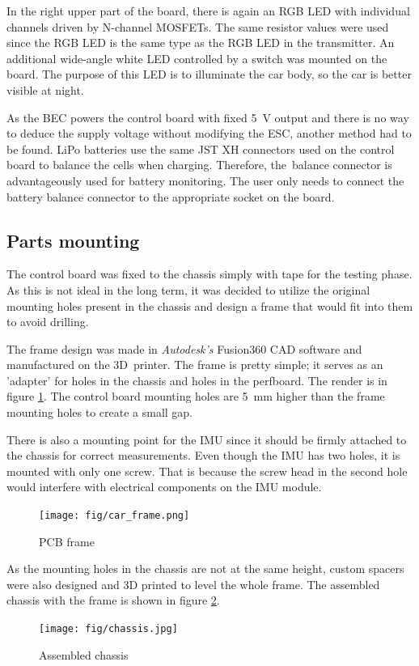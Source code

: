In the right upper part of the board, there is again an RGB LED with individual channels driven by N-channel MOSFETs. The same resistor values were used since the RGB LED is the same type as the RGB LED in the transmitter. An additional wide-angle white LED controlled by a switch was mounted on the board. The purpose of this LED is to illuminate the car body, so the car is better visible at night.

As the BEC powers the control board with fixed \SI{5}{\V} output and there is no way to deduce the supply voltage without modifying the ESC, another method had to be found. LiPo batteries use the same JST XH connectors used on the control board to balance the cells when charging. Therefore, the~balance connector is advantageously used for battery monitoring. The user only needs to connect the battery balance connector to the appropriate socket on the board.

\subsection{Parts mounting}
The control board was fixed to the chassis simply with tape for the testing phase. As this is not ideal in the long term, it was decided to utilize the original mounting holes present in the chassis and design a frame that would fit into them to avoid drilling.

The frame design was made in \textit{Autodesk's} Fusion360 CAD software and manufactured on the 3D~printer. The frame is pretty simple; it serves as an 'adapter' for holes in the chassis and holes in the perfboard. The render is in figure \ref{fig:frame}. The control board mounting holes are \SI{5}{\mm} higher than the frame mounting holes to create a small gap.

There is also a mounting point for the IMU since it should be firmly attached to the chassis for correct measurements. Even though the IMU has two holes, it is mounted with only one screw. That is because the screw head in the second hole would interfere with electrical components on the IMU module.
\begin{figure}[h]
\centering
\texttt{[image: fig/car\_frame.png]}
\caption{PCB frame}
\label{fig:frame}
\end{figure}

As the mounting holes in the chassis are not at the same height, custom spacers were also designed and 3D printed to level the whole frame. The assembled chassis with the frame is shown in figure \ref{fig:chasis}.
\begin{figure}[h]
\centering
\texttt{[image: fig/chassis.jpg]}
\caption{Assembled chassis}
\label{fig:chasis}
\end{figure}
